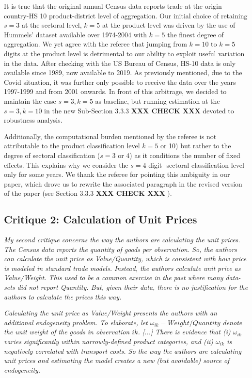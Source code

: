 \documentclass[a4paper,11pt]{article}
\begin{document}
\begin{itemize}
\begin{enumerate}
\begin{table}[htbp]
It is true that the original annual Census data reports trade at the origin country-HS 10 product-district level of aggregation. Our initial choice of retaining $s=3$ at the sectoral level, $k=5$ at the product level was driven by the use of Hummels' dataset available over 1974-2004 with $k=5$ the finest degree of aggregation. We yet agree with the referee that jumping from $k=10$ to $k=5$ digits at the product level is detrimental to our ability to exploit useful variation in the data. After checking with the US Bureau of Census, HS-10 data is only available since 1989, now available to 2019. As previously mentioned, due to the Covid situation, it was further only possible to receive the data over the years 1997-1999 and from 2001 onwards. In front of this arbitrage, we decided to maintain the case $s=3, k=5$ as baseline, but running estimation at the $s=3,k=10$ in the new Sub-Section 3.3.3 \textbf{XXX CHECK XXX }devoted to robustness analysis.

Additionally, the computational burden mentioned by the referee is not attributable to the product classification level $k=5$ or 10) but rather to the degree of sectoral classification ($s=3$ or 4) as it conditions the number of fixed effects. This explains why we consider the $s=4$ digit- sectoral classification level only for some years. We thank the referee for pointing this ambiguity in our paper, which drove us to rewrite the associated paragraph in the revised version of the paper (see Section 3.3.3 \textbf{XXX CHECK XXX }).


\subsection{Critique 2: Calculation of Unit Prices}

\textit{My second critique concerns the way the authors are calculating the unit prices.
The Census data reports the quantity of goods per observation. So, the authors
can calculate the unit price as Value/Quantity, which is consistent with how
price is modeled in standard trade models. Instead, the authors calculate unit
price as Value/Weight. This used to be a common exercise in the past where
many data-sets did not report Quantity. But, given their data, there is no
justification for the authors to calculate the prices this way.}

\textit{Calculating the unit price as Value/Weight presents the authors
with an additional endogeneity problem. To elaborate, let $\omega_{ik} = Weight/Quantity$
denote the unit weight of the goods in observation $ik$. [...] There is evidence that (i) $\omega_{ik}$ varies significantly within narrowly-defined product
categories, and (ii) $\omega_{ik}$ is negatively correlated with transport costs. So the
way the authors are calculating unit prices and estimating the model creates a
new (but avoidable) source of endogeneity.}


\end{table}
\end{enumerate}
\end{itemize}
\end{document}
